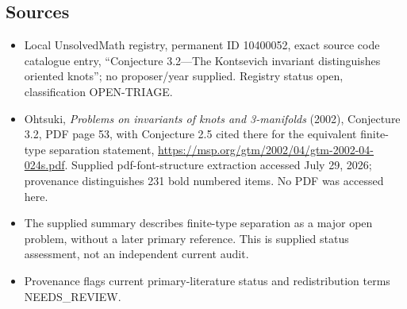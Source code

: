 \documentclass[11pt]{article}
\begin{document}
\subsection{Sources}
\begin{itemize}
\item Local UnsolvedMath registry, permanent ID 10400052, exact source code catalogue entry, ``Conjecture 3.2---The Kontsevich invariant distinguishes oriented knots''; no proposer/year supplied. Registry status open, classification OPEN-TRIAGE.
\item Ohtsuki, \emph{Problems on invariants of knots and 3-manifolds} (2002), Conjecture 3.2, PDF page 53, with Conjecture 2.5 cited there for the equivalent finite-type separation statement, \url{https://msp.org/gtm/2002/04/gtm-2002-04-024s.pdf}. Supplied pdf-font-structure extraction accessed July 29, 2026; provenance distinguishes 231 bold numbered items. No PDF was accessed here.
\item The supplied summary describes finite-type separation as a major open problem, without a later primary reference. This is supplied status assessment, not an independent current audit.
\item Provenance flags current primary-literature status and redistribution terms NEEDS\_REVIEW.
\end{itemize}
\end{document}
